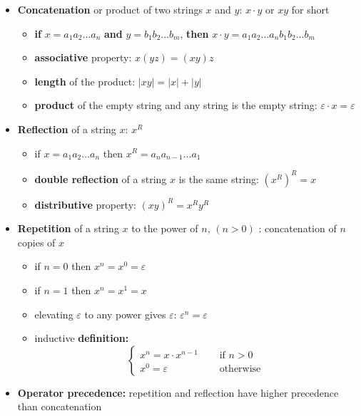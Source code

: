 \documentclass[english]{article}
\begin{document}
\begin{itemize}
  \item \textbf{Concatenation} or product of two strings \(x\) and \(y\): \(x \cdot y\) or \(xy\) for short
        \begin{itemize}
          \item \textbf{if} \(x = a_1a_2\ldots a_n\) \textbf{and} \(y = b_1b_2\ldots b_m\), \textbf{then} \(x \cdot y = a_1a_2\ldots a_n b_1b_2\ldots b_m\)
          \item \textbf{associative} property: \(x  (y  z) = (x  y)  z\)
          \item \textbf{length} of the product: \(|x  y| = |x| + |y|\)
          \item \textbf{product} of the empty string and any string is the empty string: \(\varepsilon \cdot x = \varepsilon\)
        \end{itemize}
  \item \textbf{Reflection} of a string \(x\): \(x^R\)
        \begin{itemize}
          \item if \(x = a_1a_2\ldots a_n\) then \(x^R = a_na_{n-1}\ldots a_1\)
          \item \textbf{double reflection} of a string \(x\) is the same string: \(\left(x^R\right)^R = x\)
          \item \textbf{distributive} property: \((x y)^R = x^R y^R\)
        \end{itemize}
  \item \textbf{Repetition} of a string \(x\) to the power of \(n, \, (n > 0)\) : concatenation of \(n\) copies of \(x\)
        \begin{itemize}
          \item if \(n = 0\) then \(x^n = x^0 = \varepsilon\)
          \item if \(n = 1\) then \(x^n = x^1 = x\)
          \item elevating \(\varepsilon\) to any power gives \(\varepsilon\): \(\varepsilon^n = \varepsilon\)
          \item inductive \textbf{definition:} \[\begin{cases}
                    x ^ n = x \cdot x ^ {n - 1} \quad & \text{ if } n > 0  \\
                    x ^ 0 = \varepsilon \quad         & \text{ otherwise }
                  \end{cases}\]
        \end{itemize}
  \item \textbf{Operator precedence:} repetition and reflection have higher precedence than concatenation
\end{itemize}
\end{document}
